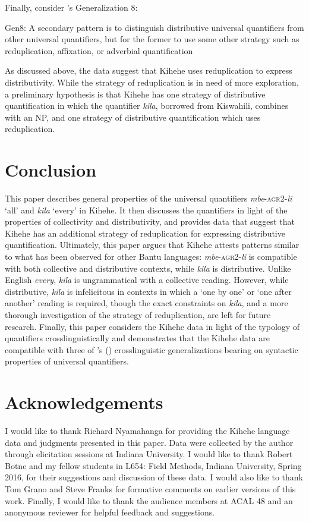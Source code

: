 \documentclass[output=paper,modfonts,nonflat]{langsci/langscibook}
\begin{document}
Finally, consider \citeauthor{Matthewson2013}'s Generalization 8: 

\begin{exe}
\ex Gen8: A secondary pattern is to distinguish distributive universal quantifiers from other universal quantifiers, but for the former to use some other strategy such as reduplication, affixation, or adverbial quantification \citep[37]{Matthewson2013}
\end{exe}

As discussed above, the data suggest that Kihehe uses reduplication to express distributivity.  While the strategy of reduplication is in need of more exploration, a preliminary hypothesis is that Kihehe has one strategy of distributive quantification in which the quantifier \textit{kila}, borrowed from Kiswahili, combines with an NP, and one strategy of distributive quantification which uses reduplication. 

\section{Conclusion}

This paper describes general properties of the universal quantifiers \textit{mbe}-\textsc{agr2}-\textit{li} `all' and \textit{kila} `every' in Kihehe. It then discusses the quantifiers in light of the properties of collectivity and distributivity, and provides data that suggest that Kihehe has an additional strategy of reduplication for expressing distributive quantification. Ultimately, this paper argues that Kihehe attests patterns similar to what has been observed for other Bantu languages: \textit{mbe}-\textsc{agr2}-\textit{li} is compatible with both collective and distributive contexts, while \textit{kila} is distributive. Unlike English \textit{every}, \textit{kila} is ungrammatical with a collective reading. However, while distributive, \textit{kila} is infelicitous in contexts in which a `one by one' or `one after another' reading is required, though the exact constraints on \textit{kila}, and a more thorough investigation of the strategy of reduplication, are left for future research. Finally, this paper considers the Kihehe data in light of the typology of quantifiers crosslinguistically and demonstrates that the Kihehe data are compatible with three of \citeauthor{Matthewson2013}'s (\citeyear{Matthewson2013}) crosslinguistic generalizations bearing on syntactic properties of universal quantifiers.

\section*{Acknowledgements}
I would like to thank Richard Nyamahanga for providing the Kihehe language data and judgments presented in this paper. Data were collected by the author through elicitation sessions at Indiana University.  I would like to thank Robert Botne and my fellow students in L654: Field Methods, Indiana University, Spring 2016, for their suggestions and discussion of these data. I would also like to thank Tom Grano and Steve Franks for formative comments on earlier versions of this work. Finally, I would like to thank the audience members at ACAL 48 and an anonymous reviewer for helpful feedback and suggestions.
\end{document}
